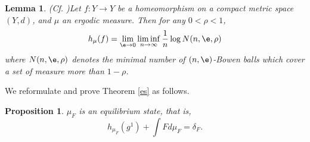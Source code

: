 \documentclass[11pt]{amsart}
\newtheorem{lemma}[theorem]{Lemma}
\newtheorem{proposition}[theorem]{Proposition}
\theoremstyle{definition}
\def\d{\delta}   %
\begin{document}
\begin{lemma}(Cf. \cite[Theorem I.I]{Kat})\label{Katok}
 Let $f:Y\to Y$ be a homeomorphism on a compact metric space $(Y,d)$, and $\mu$ an ergodic measure. Then for any $0<\rho<1$,
 \[h_\mu(f)=\lim_{\e\to 0}\liminf_{n\to \infty}\frac{1}{n}\log N(n,\e,\rho)\]
 where $N(n,\e,\rho)$ denotes the minimal number of $(n,\e)$-Bowen balls which cover a set of measure more than $1-\rho$.
\end{lemma}

We reformulate and prove Theorem \ref{es} as follows.
\begin{proposition}
$\mu_F$ is an equilibrium state, that is,
\begin{equation*}
h_{\mu_{F}}(g^1)+\int Fd\mu_{F} =\d_F.
\end{equation*}
\end{proposition}
\end{document}
